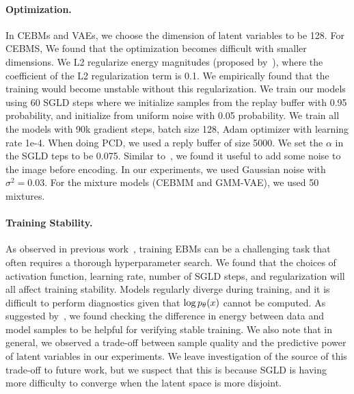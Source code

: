 \documentclass[tablecaption=bottom,wcp]{jmlr} %
\begin{document}
\paragraph{Optimization.} In CEBMs and VAEs, we choose the dimension of latent variables to be 128. For CEBMS, We found that the optimization becomes difficult with smaller dimensions. We L2 regularize energy magnitudes (proposed by~\citet{du2019implicit}), where the coefficient of the L2 regularization term is 0.1. We empirically found that the training would become unstable without this regularization. We train our models using 60 SGLD steps where we initialize samples from the replay buffer with 0.95 probability, and initialize from uniform noise with 0.05 probability. We train all the models with 90k gradient steps, batch size 128, Adam optimizer with learning rate 1e-4. When doing PCD, we used a reply buffer of size 5000. We set the $\alpha$ in the SGLD teps to be 0.075. Similar to~\citet{du2019implicit}, we found it useful to add some noise to the image before encoding. In our experiments, we used Gaussian noise with $\sigma^{2} = 0.03$. For the mixture models (CEBMM and GMM-VAE), we used 50 mixtures.  

\paragraph{Training Stability.} As observed in previous work~\cite{du2019implicit,grathwohl2019your}, training EBMs can be a challenging task that often requires a thorough hyperparameter search. We found that the choices of activation function, learning rate, number of SGLD steps, and regularization will all affect training stability. Models regularly diverge during training, and it is difficult to perform diagnostics given that $\log p_{\theta}(x)$ cannot be computed. As suggested by~\cite{nijkamp2019anatomy}, we found checking the difference in energy between data and model samples to be helpful for verifying stable training. We also note that in general, we observed a trade-off between sample quality and the predictive power of latent variables in our experiments. We leave investigation of the source of this trade-off to future work, but we suspect that this is because SGLD is having more difficulty to converge when the latent space is more disjoint.  

\newpage
\end{document}

